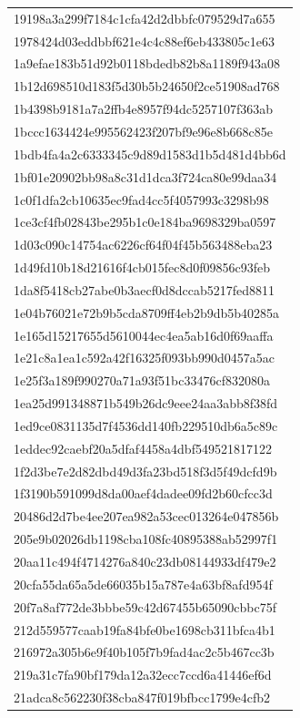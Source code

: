 \begin{tabular}{l}
19198a3a299f7184c1cfa42d2dbbfc079529d7a655 \\
1978424d03eddbbf621e4c4c88ef6eb433805c1e63 \\
1a9efae183b51d92b0118bdedb82b8a1189f943a08 \\
1b12d698510d183f5d30b5b24650f2ce51908ad768 \\
1b4398b9181a7a2ffb4e8957f94dc5257107f363ab \\
1bccc1634424e995562423f207bf9e96e8b668c85e \\
1bdb4fa4a2c6333345c9d89d1583d1b5d481d4bb6d \\
1bf01e20902bb98a8c31d1dca3f724ca80e99daa34 \\
1c0f1dfa2cb10635ec9fad4cc5f4057993c3298b98 \\
1ce3cf4fb02843be295b1c0e184ba9698329ba0597 \\
1d03c090c14754ac6226cf64f04f45b563488eba23 \\
1d49fd10b18d21616f4cb015fec8d0f09856c93feb \\
1da8f5418cb27abe0b3aecf0d8dccab5217fed8811 \\
1e04b76021e72b9b5cda8709ff4eb2b9db5b40285a \\
1e165d15217655d5610044ec4ea5ab16d0f69aaffa \\
1e21c8a1ea1c592a42f16325f093bb990d0457a5ac \\
1e25f3a189f990270a71a93f51bc33476cf832080a \\
1ea25d991348871b549b26dc9eee24aa3abb8f38fd \\
1ed9ce0831135d7f4536dd140fb229510db6a5c89c \\
1eddec92caebf20a5dfaf4458a4dbf549521817122 \\
1f2d3be7e2d82dbd49d3fa23bd518f3d5f49dcfd9b \\
1f3190b591099d8da00aef4dadee09fd2b60cfcc3d \\
20486d2d7be4ee207ea982a53cec013264e047856b \\
205e9b02026db1198cba108fc40895388ab52997f1 \\
20aa11c494f4714276a840c23db08144933df479e2 \\
20cfa55da65a5de66035b15a787e4a63bf8afd954f \\
20f7a8af772de3bbbe59c42d67455b65090cbbc75f \\
212d559577caab19fa84bfe0be1698cb311bfca4b1 \\
216972a305b6e9f40b105f7b9fad4ac2c5b467cc3b \\
219a31c7fa90bf179da12a32ecc7ccd6a41446ef6d \\
21adca8c562230f38cba847f019bfbcc1799e4cfb2 \\

\end{tabular}
